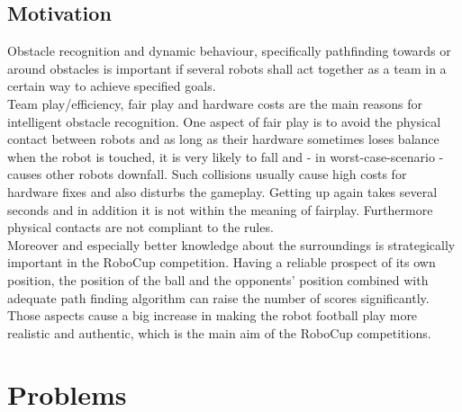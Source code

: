 \documentclass[lnicst,a4paper]{svmultln}
\begin{document}

\subsection{Motivation}

Obstacle recognition and dynamic behaviour, specifically pathfinding towards or around obstacles is important if several robots shall act together as a team in a certain way to achieve specified goals.
\\
Team play/efficiency, fair play and hardware costs are the main reasons for intelligent obstacle recognition. One aspect of fair play is to avoid the physical contact between robots and as long as their hardware sometimes loses balance when the robot is touched, it is very likely to fall and - in worst-case-scenario - causes other robots downfall. Such collisions usually cause high costs for hardware fixes and also disturbs the gameplay. Getting up again takes several seconds and in addition it is not within the meaning of fairplay. Furthermore physical contacts are not compliant to the rules.
\\
Moreover and especially better knowledge about the surroundings is strategically important in the RoboCup competition. Having a reliable prospect of its own position, the position of the ball and the opponents' position combined with adequate path finding algorithm can raise the number of scores significantly.
\\
Those aspects cause a big increase in making the robot football play more realistic and authentic, which is the main aim of the RoboCup competitions.





\section{Problems}
\end{document}
